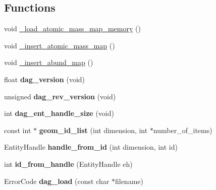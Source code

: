 \subsection*{Functions}
\begin{DoxyCompactItemize}
\item 
void \hyperlink{namespacepyne_a17db902268741d241fcc9d57ff7eef13}{\+\_\+load\+\_\+atomic\+\_\+mass\+\_\+map\+\_\+memory} ()
\item 
void \hyperlink{namespacepyne_a7deefcb42d075c174f1cf4f196246cce}{\+\_\+insert\+\_\+atomic\+\_\+mass\+\_\+map} ()
\item 
void \hyperlink{namespacepyne_a6acc3972fa6eeb9761f4c858af078529}{\+\_\+insert\+\_\+abund\+\_\+map} ()
\item 
float {\bfseries dag\+\_\+version} (void)\hypertarget{namespacepyne_a2213248fb59d53de02ff3317321f35a1}{}\label{namespacepyne_a2213248fb59d53de02ff3317321f35a1}

\item 
unsigned {\bfseries dag\+\_\+rev\+\_\+version} (void)\hypertarget{namespacepyne_a3a4f252b82e4290ee8c9e82a8db38da6}{}\label{namespacepyne_a3a4f252b82e4290ee8c9e82a8db38da6}

\item 
int {\bfseries dag\+\_\+ent\+\_\+handle\+\_\+size} (void)\hypertarget{namespacepyne_a258aedf1cd43d592c20dc7527db14fc1}{}\label{namespacepyne_a258aedf1cd43d592c20dc7527db14fc1}

\item 
const int $\ast$ {\bfseries geom\+\_\+id\+\_\+list} (int dimension, int $\ast$number\+\_\+of\+\_\+items)\hypertarget{namespacepyne_a947c94bdefb6541c33439817b5293ef9}{}\label{namespacepyne_a947c94bdefb6541c33439817b5293ef9}

\item 
Entity\+Handle {\bfseries handle\+\_\+from\+\_\+id} (int dimension, int id)\hypertarget{namespacepyne_a793858138da0f88a32c4b03401bef215}{}\label{namespacepyne_a793858138da0f88a32c4b03401bef215}

\item 
int {\bfseries id\+\_\+from\+\_\+handle} (Entity\+Handle eh)\hypertarget{namespacepyne_ac13399f54545bd88502c3cb7e2fae4c3}{}\label{namespacepyne_ac13399f54545bd88502c3cb7e2fae4c3}

\item 
Error\+Code {\bfseries dag\+\_\+load} (const char $\ast$filename)\hypertarget{namespacepyne_ae29cb4ffcd3fea6fbb2b6418cdb0b42d}{}\label{namespacepyne_ae29cb4ffcd3fea6fbb2b6418cdb0b42d}


\end{DoxyCompactItemize}
